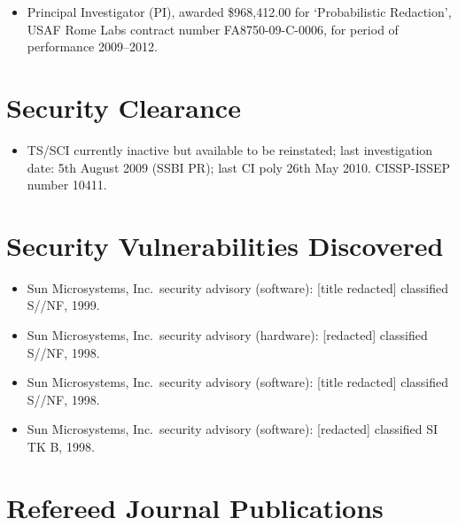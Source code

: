 \documentclass[12pt,letterpaper]{article}
\begin{document}
\vspace{-2mm}
\begin{itemize}
	\item Principal Investigator (PI), awarded \$968,412.00 for `Probabilistic Redaction',
	USAF Rome Labs contract number FA8750-09-C-0006, for period of performance 2009--2012.
\end{itemize}

\vspace{-8mm}
\section*{Security Clearance}

\vspace{-2mm}
\begin{itemize}
	\item TS/SCI currently inactive but available to be reinstated; last investigation date:
		5th August 2009 (SSBI PR); last CI poly 26th May 2010.  CISSP-ISSEP number 10411.
\end{itemize}



\section*{Security Vulnerabilities Discovered}

\begin{itemize}
    \item Sun Microsystems, Inc.\ security advisory (software): [title redacted] classified S//NF,
		1999.
	\vspace{-2mm}
	\item Sun Microsystems, Inc.\ security advisory (hardware): [redacted] classified S//NF,
		1998.
	\vspace{-2mm}
	\item Sun Microsystems, Inc.\ security advisory (software): [title redacted] classified S//NF,
		1998.
	\vspace{-2mm}
	\item Sun Microsystems, Inc.\ security advisory (software): [redacted] classified SI TK B, 1998.
\end{itemize}

\vspace{-8mm}
\section*{Refereed Journal Publications}
\end{document}
